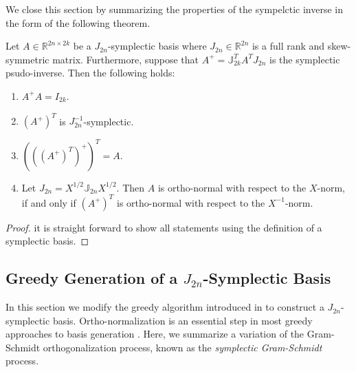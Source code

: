 We close this section by summarizing the properties of the sympelctic inverse in the form of the following theorem.
\begin{theorem} \label{thm:2}
Let $A\in \mathbb R^{2n\times 2k}$ be a $J_{2n}$-symplectic basis where $J_{2n}\in\mathbb R^{2n}$ is a full rank and skew-symmetric matrix. Furthermore, suppose that $A^{+} = \mathbb{J}_{2k}^T A^T J_{2n}$ is the symplectic psudo-inverse. Then the following holds:
\begin{enumerate}
\item $A^+A = I_{2k}$.
\item $(A^+)^T$ is $J_{2n}^{-1}$-symplectic.
\item $\left(\left(\left(A^+\right)^T\right)^+\right)^T = A$.
\item Let $J_{2n}=X^{1/2}\mathbb J_{2n} X^{1/2}$. Then $A$ is ortho-normal with respect to the $X$-norm, if and only if $(A^+)^T$ is ortho-normal with respect to the $X^{-1}$-norm.
\end{enumerate}
\end{theorem}
\begin{proof}
it is straight forward to show all statements using the definition of a symplectic basis.
\end{proof}

\subsection{Greedy Generation of a $J_{2n}$-Symplectic Basis} \label{sec:normmor.2}
In this section we modify the greedy algorithm introduced in  to construct a $J_{2n}$-symplectic basis. Ortho-normalization is an essential step in most greedy approaches to basis generation \cite{hesthaven2015certified,quarteroni2015reduced}. Here, we summarize a variation of the Gram-Schmidt orthogonalization process, known as the \emph{symplectic Gram-Schmidt} process.

